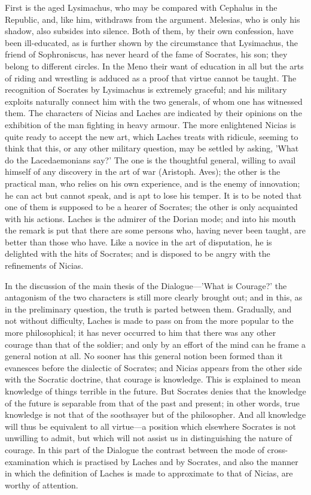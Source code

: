\documentclass[11pt,letter]{book}
\begin{document}
\par  First is the aged Lysimachus, who may be compared with Cephalus in the Republic, and, like him, withdraws from the argument. Melesias, who is only his shadow, also subsides into silence. Both of them, by their own confession, have been ill-educated, as is further shown by the circumstance that Lysimachus, the friend of Sophroniscus, has never heard of the fame of Socrates, his son; they belong to different circles. In the Meno their want of education in all but the arts of riding and wrestling is adduced as a proof that virtue cannot be taught. The recognition of Socrates by Lysimachus is extremely graceful; and his military exploits naturally connect him with the two generals, of whom one has witnessed them. The characters of Nicias and Laches are indicated by their opinions on the exhibition of the man fighting in heavy armour. The more enlightened Nicias is quite ready to accept the new art, which Laches treats with ridicule, seeming to think that this, or any other military question, may be settled by asking, 'What do the Lacedaemonians say?' The one is the thoughtful general, willing to avail himself of any discovery in the art of war (Aristoph. Aves); the other is the practical man, who relies on his own experience, and is the enemy of innovation; he can act but cannot speak, and is apt to lose his temper. It is to be noted that one of them is supposed to be a hearer of Socrates; the other is only acquainted with his actions. Laches is the admirer of the Dorian mode; and into his mouth the remark is put that there are some persons who, having never been taught, are better than those who have. Like a novice in the art of disputation, he is delighted with the hits of Socrates; and is disposed to be angry with the refinements of Nicias.

\par  In the discussion of the main thesis of the Dialogue—'What is Courage?' the antagonism of the two characters is still more clearly brought out; and in this, as in the preliminary question, the truth is parted between them. Gradually, and not without difficulty, Laches is made to pass on from the more popular to the more philosophical; it has never occurred to him that there was any other courage than that of the soldier; and only by an effort of the mind can he frame a general notion at all. No sooner has this general notion been formed than it evanesces before the dialectic of Socrates; and Nicias appears from the other side with the Socratic doctrine, that courage is knowledge. This is explained to mean knowledge of things terrible in the future. But Socrates denies that the knowledge of the future is separable from that of the past and present; in other words, true knowledge is not that of the soothsayer but of the philosopher. And all knowledge will thus be equivalent to all virtue—a position which elsewhere Socrates is not unwilling to admit, but which will not assist us in distinguishing the nature of courage. In this part of the Dialogue the contrast between the mode of cross-examination which is practised by Laches and by Socrates, and also the manner in which the definition of Laches is made to approximate to that of Nicias, are worthy of attention.
\end{document}
